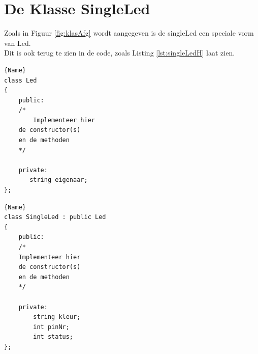 \section{De Klasse SingleLed} \label{sec:singleLed}

Zoals in Figuur \ref{fig:klasAfg} wordt aangegeven is de singleLed een speciale vorm van Led. \\Dit is ook terug te zien in de code, zoals Listing \ref{lst:singleLedH} laat zien.

\noindent\begin{minipage}{.45\textwidth}
\begin{lstlisting}[caption=LED declaratie file(.h),frame=tlrb,label={lst:ledBaseH}]{Name}
class Led
{
	public:
	/*
		Implementeer hier 
	de constructor(s) 
	en de methoden
	*/
	
	private:
       string eigenaar;
};
\end{lstlisting}
\end{minipage}\hfill
\begin{minipage}{.45\textwidth}
\begin{lstlisting}[caption=SingleLed declaratie file(.h),frame=tlrb,label={lst:singleLedH}]{Name}
class SingleLed : public Led
{
	public:
	/*
	Implementeer hier 
	de constructor(s) 
	en de methoden
	*/

	private:
        string kleur;
	    int pinNr;
	    int status;
};
\end{lstlisting}
\end{minipage}
